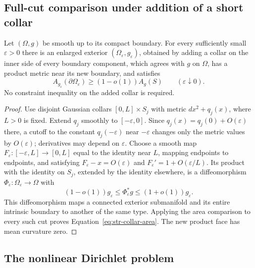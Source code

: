 \subsection{Full-cut comparison under addition of a short collar}

\begin{lemma}
\label{lem:str-added-collar}
Let $(\Omega,g)$ be smooth up to its compact boundary. For every
sufficiently small $\varepsilon>0$ there is an enlarged exterior
$(\Omega_\varepsilon,g_\varepsilon)$, obtained by adding a collar on
the inner side of every boundary component, which agrees with $g$ on
$\Omega$, has a product metric near its new boundary, and satisfies
\begin{equation}
 A_{g_\varepsilon}(\partial\Omega_\varepsilon)
 \geq(1-o(1))A_g(S)\qquad(\varepsilon\downarrow0).
 \label{eq:str-collar-area}
\end{equation}
No constraint inequality on the added collar is required.
\end{lemma}

\begin{proof}
Use disjoint Gaussian collars $[0,L]\times S_j$ with metric
$dx^2+q_j(x)$, where $L>0$ is fixed. Extend $q_j$ smoothly to
$[-\varepsilon,0]$. Since $q_j(x)=q_j(0)+O(\varepsilon)$ there, a
cutoff to the constant $q_j(-\varepsilon)$ near $-\varepsilon$ changes
only the metric values by $O(\varepsilon)$; derivatives may depend on
$\varepsilon$. Choose a smooth map
$F_\varepsilon:[-\varepsilon,L]\to[0,L]$ equal to the identity near
$L$, mapping endpoints to endpoints, and satisfying
$F_\varepsilon-x=O(\varepsilon)$ and
$F_\varepsilon'=1+O(\varepsilon/L)$. Its product with the identity on
$S_j$, extended by the identity elsewhere, is a diffeomorphism
$\Phi_\varepsilon:\Omega_\varepsilon\to\Omega$ with
\[
 (1-o(1))g_\varepsilon\leq\Phi_\varepsilon^*g
                       \leq(1+o(1))g_\varepsilon.
\]
This diffeomorphism maps a connected exterior submanifold and its
entire intrinsic boundary to another of the same type. Applying the
area comparison to every such cut proves
Equation~\eqref{eq:str-collar-area}. The new product face has mean
curvature zero.
\end{proof}

\subsection{The nonlinear Dirichlet problem}
\label{str-pde-section}

